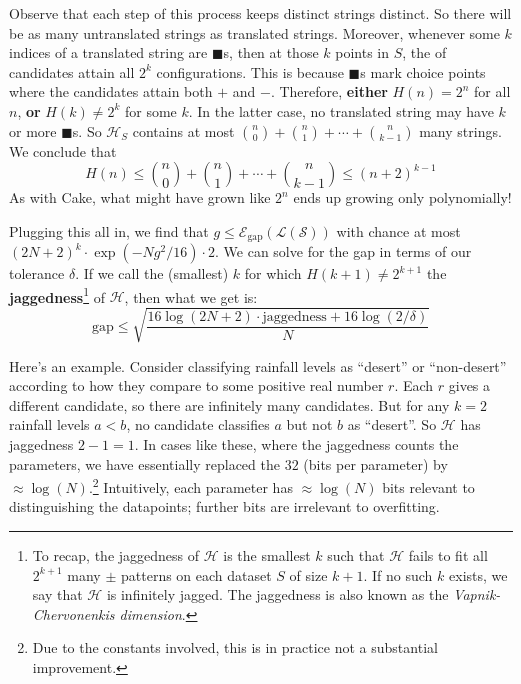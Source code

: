 \documentclass[openany, notitlepage, justified]{tufte-book}
\newcommand{\Ee}{\mathcal{E}}
\newcommand{\Hh}{\mathcal{H}}
\newcommand{\Ll}{\mathcal{L}}
\newcommand{\Ss}{\mathcal{S}}
\begin{document}
            Observe that each step of this process keeps distinct strings
            distinct.  So there will be as many untranslated strings as
            translated strings.
            Moreover, whenever some $k$ indices of a translated string are
            $\blacksquare$s, then at those $k$ points in $S$, the
            of candidates attain all $2^k$ configurations.  This is
            because $\blacksquare$s mark choice points where the candidates
            attain both $+$ and $-$.
            Therefore, \textbf{either} $H(n)=2^n$ for all $n$,
            \textbf{or} $H(k) \neq 2^k$ for some $k$.  In the latter 
            case, no translated string may have $k$ or more
            $\blacksquare$s.  So $\Hh_S$ contains at most
            $
                {n\choose 0} + {n\choose 1} + \cdots + {n\choose k-1}
            $
            many strings.  We conclude that
            $$
                H(n)
                \leq 
                {n\choose 0} + {n\choose 1} + \cdots + {n\choose k-1}
                \leq 
                (n+2)^{k-1}
            $$
            As with Cake, what might have grown like $2^n$
            ends up growing only polynomially!

            Plugging this all in, we find that
            $
               g \leq \Ee_{\text{gap}}(\Ll(\Ss))
            $ with chance at most
            $
               (2N+2)^k \cdot \exp(-Ng^2/16) \cdot 2
            $.
            We can solve for the gap in terms of our tolerance $\delta$.
            If we call the (smallest) $k$ for which $H(k+1) \neq 2^{k+1}$
            the \textbf{jaggedness}\footnote{
                To recap, the jaggedness of $\Hh$ is the smallest $k$ such
                that $\Hh$ fails to fit all $2^{k+1}$ many $\pm$ patterns
                on each dataset $S$ of size $k+1$.
                If no such $k$ exists, we say that $\Hh$ is infinitely jagged.
                The jaggedness is also known as the \emph{Vapnik-Chervonenkis
                dimension}.
            } of $\Hh$, then what we get is:
            $$
                \text{gap}
                \leq
                \sqrt{\frac{16\log(2N+2) \cdot \text{jaggedness} + 16\log(2/\delta)}{N}}
            $$

            Here's an example.  Consider classifying rainfall levels as
            ``desert'' or ``non-desert'' according to how they compare to
            some positive real number $r$.  Each $r$ gives a different
            candidate, so there are infinitely many candidates.  But for any
            $k=2$ rainfall levels $a<b$, no candidate classifies $a$ but not
            $b$ as ``desert''.  So $\Hh$ has jaggedness $2-1=1$.
            In cases like these, where the jaggedness counts the parameters, we
            have essentially replaced the $32$ (bits per parameter) by $\approx
            \log(N)$.\footnote{
                Due to the constants involved, this is in practice not a
                substantial improvement.
            } Intuitively, each parameter has $\approx \log(N)$ bits
            relevant to distinguishing the datapoints; further bits are
            irrelevant to overfitting.
\end{document}
